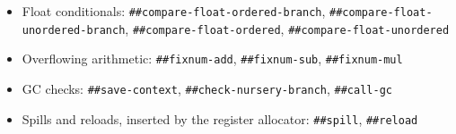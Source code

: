 \begin{itemize}
\item
\begin{flushleft}
Float conditionals:
\Verb|##compare-float-ordered-branch|,
\Verb|##compare-float-unordered-branch|,
\Verb|##compare-float-ordered|,
\Verb|##compare-float-unordered|
\end{flushleft}

\item
\begin{flushleft}
Overflowing arithmetic:
\Verb|##fixnum-add|,
\Verb|##fixnum-sub|,
\Verb|##fixnum-mul|
\end{flushleft}

\item
\begin{flushleft}
\Gls{GC} checks:
\Verb|##save-context|,
\Verb|##check-nursery-branch|,
\Verb|##call-gc|
\end{flushleft}

\item
\begin{flushleft}
Spills and reloads, inserted by the register allocator:
\Verb|##spill|,
\Verb|##reload|
\end{flushleft}
\end{itemize}
